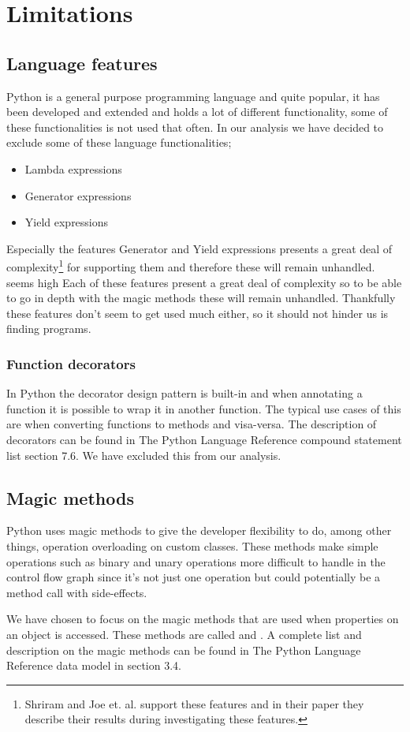 \chapter{Limitations}

\section{Language features}
Python is a general purpose programming language and quite popular, it has been developed and extended and holds a lot of different functionality, some of these functionalities is not used that often. In our analysis we have decided to exclude some of these language functionalities;

\begin{itemize}
	\item Lambda expressions
	\item Generator expressions
	\item Yield expressions
\end{itemize}

Especially the features Generator and Yield expressions presents a great deal of complexity\footnote{Shriram and Joe et. al. support these features and in their paper they describe their results during investigating these features\cite{lambdapy}. } for supporting them and therefore these will remain unhandled.
seems high Each of these features present a great deal of complexity so to be able to go in depth with the magic methods these will remain unhandled. Thankfully these features don't seem to get used much either, so it should not hinder us is finding programs.

\subsection{Function decorators}
In Python the decorator design pattern is built-in and when annotating a function it is possible to wrap it in another function. The typical use cases of this are when converting functions to methods and visa-versa. The description of decorators can be found in The Python Language Reference compound statement list\cite{pyref.compound} section 7.6. We have excluded this from our analysis.

\section{Magic methods}
Python uses magic methods to give the developer flexibility to do, among other things, operation overloading on custom classes. These methods make simple operations such as binary and unary operations more difficult to handle in the control flow graph since it's not just one operation but could potentially be a method call with side-effects.

We have chosen to focus on the magic methods that are used when properties on an object is accessed. These methods are called  and . A complete list and description on the magic methods can be found in The Python Language Reference data model\cite{pyref.datamodel} in section 3.4.
